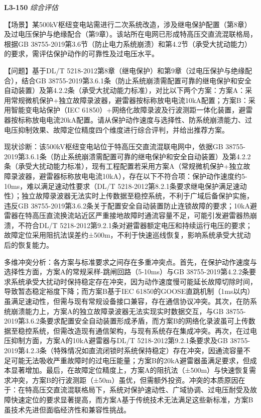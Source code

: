 \documentclass[12pt,a4paper]{ctexart}
\begin{document}
\noindent\textbf{L3-150} \hfill \textit{综合评估}
\begin{description}[leftmargin=1.5em,style=nextline,font=\normalfont]
  \item[Q:] 【场景】某500kV枢纽变电站需进行二次系统改造，涉及继电保护配置（第8章）及过电压保护与绝缘配合（第9章）。该站所在电网已形成特高压交直流混联格局，根据GB 38755-2019第3.6节（防止电力系统崩溃）和第4.2节（承受大扰动能力）的要求，需评估保护动作的可靠性及过电压水平。

【问题】基于DL/T 5218-2012第8章（继电保护）和第9章（过电压保护与绝缘配合），结合GB 38755-2019第3.6.1条（防止系统崩溃需配置可靠的继电保护和安全自动装置）及第4.2.2条（承受大扰动能力标准），对比以下两个方案：方案A：采用常规微机保护+独立故障录波器，避雷器按标称放电电流10kA配置；方案B：采用智能变电站保护（IEC 61850）+网络化故障录波及行波测距一体化装置，避雷器按标称放电电流20kA配置。请从保护动作速度与选择性、防系统崩溃能力、过电压抑制效果、故障定位精度四个维度进行综合评判，并给出推荐方案。
  \item[A:] 现状诊断：该500kV枢纽变电站位于特高压交直流混联电网中，依据GB 38755-2019第3.6.1条（防止系统崩溃需配置可靠的继电保护和安全自动装置）及第4.2.2条（承受大扰动能力标准），现有工程配置若采用方案A（常规微机保护+独立故障录波器，避雷器标称放电电流10kA），存在以下不符合项：保护动作速度约5-10ms，难以满足速动性要求（DL/T 5218-2012第8.2.1条要求继电保护满足速动性）；独立故障录波器无法实时上传数据至稳控系统，不利于广域后备保护实施，违反GB 38755-2019第3.6.2条关于配置安全自动装置防止连锁故障的要求；10kA避雷器在特高压直流换流站近区严重接地故障时通流容量不足，可能引发避雷器热崩溃，不符合DL/T 5218-2012第9.2.1条对避雷器额定电压和持续运行电压的要求；故障定位采用阻抗法误差约±500m，不利于快速巡线恢复，影响系统承受大扰动后的恢复能力。

多维冲突分析：各方案与标准要求之间存在多重冲突点。首先，在保护动作速度与选择性方面，方案A的常规采样-跳闸回路（5-10ms）与GB 38755-2019第4.2.2条要求系统承受大扰动时保持稳定存在冲突，因为动作速度慢可能延长故障切除时间，导致暂态稳定裕度下降；而方案B基于IEC 61850的GOOSE直跳机制（1ms以内）虽满足速动性，但需与现有常规设备接口兼容，存在通信协议冲突。其次，在防系统崩溃能力上，方案A的独立故障录波器无法实现实时数据交互，与GB 38755-2019第3.6.2条要求配置安全自动装置形成矛盾，而方案B的网络化录波虽可上传数据至稳控系统，但需改造现有通信架构，与现有系统存在集成冲突。再次，在过电压抑制方面，方案A的10kA避雷器与DL/T 5218-2012第9.2.1条要求及GB 38755-2019第4.2.3条（特殊情况如直流闭锁时系统保持稳定）存在冲突，因通流容量不足可能无法吸收严重故障时的过电压能量；方案B的20kA避雷器虽满足要求，但成本显著增加。最后，在故障定位精度上，方案A的阻抗法（±500m）与快速恢复需求冲突，方案B的行波测距（±50m）虽优，但需额外投资。冲突的本质原因在于：在特高压交直流混联格局下，系统对保护速动性、广域协调、过电压耐受及故障快速定位的要求显著提高，而方案A基于传统技术无法满足这些新标准，方案B虽技术先进但面临经济性和兼容性挑战。


\end{description}
\end{document}
